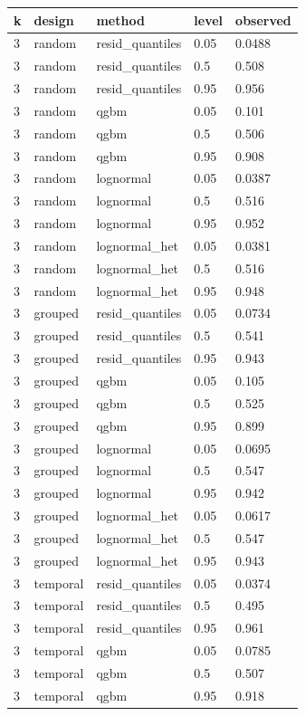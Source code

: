 \begin{tabular}{lllll}
\toprule
k & design & method & level & observed \\
\midrule
3 & random & resid\_quantiles & 0.05 & 0.0488 \\
3 & random & resid\_quantiles & 0.5 & 0.508 \\
3 & random & resid\_quantiles & 0.95 & 0.956 \\
3 & random & qgbm & 0.05 & 0.101 \\
3 & random & qgbm & 0.5 & 0.506 \\
3 & random & qgbm & 0.95 & 0.908 \\
3 & random & lognormal & 0.05 & 0.0387 \\
3 & random & lognormal & 0.5 & 0.516 \\
3 & random & lognormal & 0.95 & 0.952 \\
3 & random & lognormal\_het & 0.05 & 0.0381 \\
3 & random & lognormal\_het & 0.5 & 0.516 \\
3 & random & lognormal\_het & 0.95 & 0.948 \\
3 & grouped & resid\_quantiles & 0.05 & 0.0734 \\
3 & grouped & resid\_quantiles & 0.5 & 0.541 \\
3 & grouped & resid\_quantiles & 0.95 & 0.943 \\
3 & grouped & qgbm & 0.05 & 0.105 \\
3 & grouped & qgbm & 0.5 & 0.525 \\
3 & grouped & qgbm & 0.95 & 0.899 \\
3 & grouped & lognormal & 0.05 & 0.0695 \\
3 & grouped & lognormal & 0.5 & 0.547 \\
3 & grouped & lognormal & 0.95 & 0.942 \\
3 & grouped & lognormal\_het & 0.05 & 0.0617 \\
3 & grouped & lognormal\_het & 0.5 & 0.547 \\
3 & grouped & lognormal\_het & 0.95 & 0.943 \\
3 & temporal & resid\_quantiles & 0.05 & 0.0374 \\
3 & temporal & resid\_quantiles & 0.5 & 0.495 \\
3 & temporal & resid\_quantiles & 0.95 & 0.961 \\
3 & temporal & qgbm & 0.05 & 0.0785 \\
3 & temporal & qgbm & 0.5 & 0.507 \\
3 & temporal & qgbm & 0.95 & 0.918 \\

\end{tabular}
